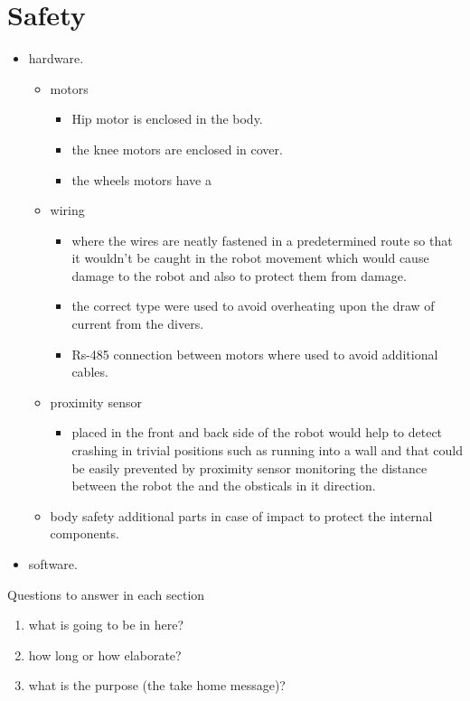 \chapter{Safety}

\graphicspath{{./Figures/Modeling}}

\begin{itemize}
	\item hardware.
	\begin{itemize}
		\item motors 
			\begin{itemize}
				\item Hip motor is enclosed in the body. 
				\item the knee motors are enclosed in cover.
				\item the wheels motors have a 
			\end{itemize}
		\item wiring 
		\begin{itemize}
			\item where the wires are neatly fastened in a predetermined route so that it wouldn't be caught in the robot movement which would cause damage to the robot and also to protect them from damage.  
			\item the correct type were used to avoid overheating upon the draw of current from the divers.
			\item Rs-485 connection between motors where used to avoid additional cables.
		\end{itemize}
	
		\item proximity sensor
		\begin{itemize}
			\item  placed in the front and back side of the robot would help to detect crashing in trivial positions such as running into a wall and that could be easily prevented by proximity sensor monitoring the distance between the robot the and the obsticals in it direction. 
		\end{itemize}
			
		\item body safety additional parts in case of impact to protect the internal components. 
	\end{itemize}
	\item software.
	
\end{itemize}


Questions to answer in each section 


\begin{enumerate}
	\item what is going to be in here?
	\item how long or how elaborate?
	\item what is the purpose (the take home message)? 
\end{enumerate}





